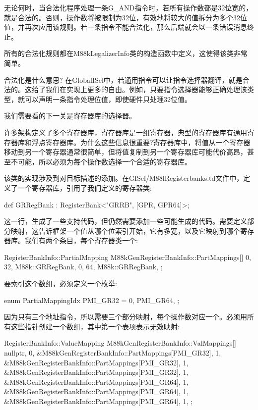 无论何时，当合法化程序处理一条G\_AND指令时，若所有操作数都是32位宽的，就是合法的。否则，操作数将被限制为32位，有效地将较大的值拆分为多个32位值，并再次应用该规则。若一条指令不能合法化，那么后端就会以一条错误消息终止。

所有的合法化规则都在M88kLegalizerInfo类的构造函数中定义，这使得该类非常简单。

\begin{myTip}{合法化是什么意思?}
在GlobalISel中，若通用指令可以让指令选择器翻译，就是合法的。这给了我们在实现上更多的自由。例如，只要指令选择器能够正确处理该类型，就可以声明一条指令处理位值，即使硬件只处理32位值。
\end{myTip}

我们需要看的下一关是寄存器库的选择器。


许多架构定义了多个寄存器库，寄存器库是一组寄存器，典型的寄存器库有通用寄存器库和浮点寄存器库。为什么这些信息很重要?寄存器库中，将值从一个寄存器移动到另一个寄存器通常很简单，但将值复制到另一个寄存器库可能代价高昂，甚至不可能，所以必须为每个操作数选择一个合适的寄存器库。

该类的实现涉及到对目标描述的添加。在GISel/M88lRegisterbanks.td文件中，定义了一个寄存器库，引用了我们定义的寄存器类:

\begin{cpp}
def GRRegBank : RegisterBank<"GRRB", [GPR, GPR64]>;
\end{cpp}

这一行，生成了一些支持代码，但仍然需要添加一些可能生成的代码。需要定义部分映射，这告诉框架一个值从哪个位索引开始，它有多宽，以及它映射到哪个寄存器库。我们有两个条目，每个寄存器类一个:

\begin{cpp}
RegisterBankInfo::PartialMapping
    M88kGenRegisterBankInfo::PartMappings[]{
        {0, 32, M88k::GRRegBank},
        {0, 64, M88k::GRRegBank},
    };
\end{cpp}

要索引这个数组，必须定义一个枚举:

\begin{cpp}
enum PartialMappingIdx { PMI_GR32 = 0, PMI_GR64, };
\end{cpp}

因为只有三个地址指令，所以需要三个部分映射，每个操作数对应一个。必须用所有这些指针创建一个数组，其中第一个表项表示无效映射:

\begin{cpp}
RegisterBankInfo::ValueMapping
    M88kGenRegisterBankInfo::ValMappings[]{
        {nullptr, 0},
        {&M88kGenRegisterBankInfo::PartMappings[PMI_GR32], 1},
        {&M88kGenRegisterBankInfo::PartMappings[PMI_GR32], 1},
        {&M88kGenRegisterBankInfo::PartMappings[PMI_GR32], 1},
        {&M88kGenRegisterBankInfo::PartMappings[PMI_GR64], 1},
        {&M88kGenRegisterBankInfo::PartMappings[PMI_GR64], 1},
        {&M88kGenRegisterBankInfo::PartMappings[PMI_GR64], 1},
    };
\end{cpp}

